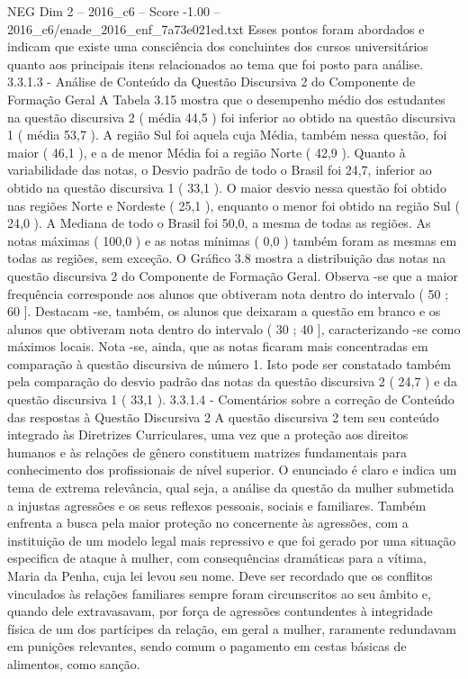 \begin{textsample}{NEG Dim 2 – 2016\_c6 – Score -1.00 – 2016\_c6/enade\_2016\_enf\_7a73e021ed.txt}
Esses pontos foram abordados e indicam que existe uma consciência dos concluintes dos cursos universitários quanto aos principais itens relacionados ao tema que foi posto para análise. 3.3.1.3 - Análise de Conteúdo da Questão Discursiva 2 do Componente de Formação Geral A Tabela 3.15 mostra que o desempenho médio dos estudantes na questão discursiva 2 ( média 44,5 ) foi inferior ao obtido na questão discursiva 1 ( média 53,7 ).
A região Sul foi aquela cuja Média, também nessa questão, foi maior ( 46,1 ), e a de menor Média foi a região Norte ( 42,9 ).
Quanto à variabilidade das notas, o Desvio padrão de todo o Brasil foi 24,7, inferior ao obtido na questão discursiva 1 ( 33,1 ).
O maior desvio nessa questão foi obtido nas regiões Norte e Nordeste ( 25,1 ), enquanto o menor foi obtido na região Sul ( 24,0 ).
A Mediana de todo o Brasil foi 50,0, a mesma de todas as regiões.
As notas máximas ( 100,0 ) e as notas mínimas ( 0,0 ) também foram as mesmas em todas as regiões, sem exceção.
O Gráfico 3.8 mostra a distribuição das notas na questão discursiva 2 do Componente de Formação Geral.
Observa -se que a maior frequência corresponde aos alunos que obtiveram nota dentro do intervalo ( 50 ; 60 ].
Destacam -se, também, os alunos que deixaram a questão em branco e os alunos que obtiveram nota dentro do intervalo ( 30 ; 40 ], caracterizando -se como máximos locais.
Nota -se, ainda, que as notas ficaram mais concentradas em comparação à questão discursiva de número 1.
Isto pode ser constatado também pela comparação do desvio padrão das notas da questão discursiva 2 ( 24,7 ) e da questão discursiva 1 ( 33,1 ). 3.3.1.4 - Comentários sobre a correção de Conteúdo das respostas à Questão Discursiva 2 A questão discursiva 2 tem seu conteúdo integrado às Diretrizes Curriculares, uma vez que a proteção aos direitos humanos e às relações de gênero constituem matrizes fundamentais para conhecimento dos profissionais de nível superior.
O enunciado é claro e indica um tema de extrema relevância, qual seja, a análise da questão da mulher submetida a injustas agressões e os seus reflexos pessoais, sociais e familiares.
Também enfrenta a busca pela maior proteção no concernente às agressões, com a instituição de um modelo legal mais repressivo e que foi gerado por uma situação especifica de ataque à mulher, com consequências dramáticas para a vítima, Maria da Penha, cuja lei levou seu nome.
Deve ser recordado que os conflitos vinculados às relações familiares sempre foram circunscritos ao seu âmbito e, quando dele extravasavam, por força de agressões contundentes à integridade física de um dos partícipes da relação, em geral a mulher, raramente redundavam em punições relevantes, sendo comum o pagamento em cestas básicas de alimentos, como sanção.

\end{textsample}
